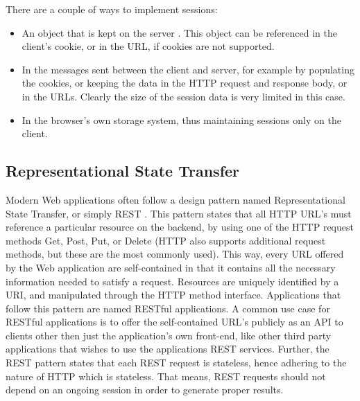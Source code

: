 There are a couple of ways to implement sessions:
\begin{itemize}
\item{} An object that is kept on the server . This object can be referenced in the client's cookie, or in the URL, if cookies are not supported. 
\item{} In the messages sent between the client and server, for example by populating the cookies, or keeping the data in the HTTP request and response body, or in the URLs. Clearly the size of the session data is very limited in this case.
\item{} In the browser's own storage system, thus maintaining sessions only on the client.
\end {itemize}

\subsection{Representational State Transfer}
Modern Web applications often follow a design pattern named Representational State Transfer, or simply REST \cite{armando2012}. This pattern states that all HTTP URL's must reference a particular resource on the backend, by using one of the HTTP request methods Get, Post, Put, or Delete (HTTP also supports additional request methods, but these are the most commonly used). This way, every URL offered by the Web application are self-contained in that it contains all the necessary information needed to satisfy a request. Resources are uniquely identified by a URI, and manipulated through the HTTP method interface. Applications that follow this pattern are named RESTful applications. A common use case for RESTful applications is to offer the self-contained URL's publicly as an API to clients other then just the application's own front-end, like other third party applications that wishes to use the applications REST services. Further, the REST pattern states that each REST request is stateless, hence adhering to the nature of HTTP which is stateless. That means, REST requests should not depend on an ongoing session in order to generate proper results.

